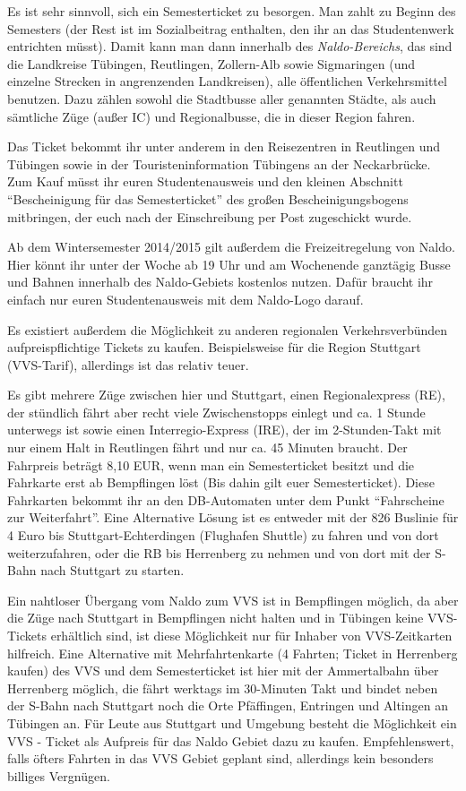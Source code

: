 Es ist sehr sinnvoll, sich ein Semesterticket zu besorgen.  Man zahlt
  zu Beginn des Semesters \Ticketpreis (der Rest ist im Sozialbeitrag
  enthalten, den ihr an das Studentenwerk entrichten müsst).  Damit
  kann man dann innerhalb des \emph{Naldo-Bereichs}, das sind die
  Landkreise Tübingen, Reutlingen, Zollern-Alb sowie Sigmaringen
  (und einzelne Strecken in angrenzenden Landkreisen), alle
  öffentlichen Verkehrsmittel benutzen. Dazu zählen sowohl die
  Stadtbusse aller genannten Städte, als auch sämtliche Züge (außer IC) und
  Regionalbusse, die in dieser Region fahren.

Das Ticket bekommt ihr unter anderem in den Reisezentren in Reutlingen und Tübingen
  sowie in der Touristeninformation Tübingens an der Neckarbrücke.
  Zum Kauf müsst ihr euren Studentenausweis und den kleinen Abschnitt "`Bescheinigung für das Semesterticket"'
  des großen Bescheinigungsbogens mitbringen, der euch nach der Einschreibung per Post zugeschickt wurde.

Ab dem Wintersemester 2014/2015 gilt außerdem die Freizeitregelung von Naldo. Hier könnt ihr unter der Woche ab 19 Uhr und am Wochenende ganztägig Busse und Bahnen innerhalb des Naldo-Gebiets kostenlos nutzen. Dafür braucht ihr einfach nur euren Studentenausweis mit dem Naldo-Logo darauf.

Es existiert außerdem die Möglichkeit zu anderen regionalen Verkehrsverbünden aufpreispflichtige Tickets zu kaufen.
Beispielsweise für die Region Stuttgart (VVS-Tarif), allerdings ist das relativ teuer.

Es gibt mehrere Züge zwischen hier und Stuttgart, einen
  Regionalexpress (RE), der stündlich fährt aber recht viele
  Zwischenstopps einlegt und ca. 1 Stunde unterwegs ist sowie einen
  Interregio-Express (IRE), der im 2-Stunden-Takt mit nur einem Halt
  in Reutlingen fährt und nur ca. 45 Minuten braucht.
  Der Fahrpreis beträgt 8,10 EUR, wenn man ein Semesterticket
  besitzt und die Fahrkarte erst ab Bempflingen löst (Bis dahin gilt euer Semesterticket).
  Diese Fahrkarten bekommt ihr an den DB-Automaten unter dem Punkt "`Fahrscheine zur Weiterfahrt"'.
Eine Alternative Lösung ist es entweder mit der 826 Buslinie für 4 Euro bis Stuttgart-Echterdingen (Flughafen Shuttle) zu fahren und von dort weiterzufahren, oder die RB bis Herrenberg zu nehmen und von dort mit der S-Bahn nach Stuttgart zu starten.


Ein nahtloser Übergang vom Naldo zum VVS ist in Bempflingen
  möglich, da aber die Züge nach Stuttgart in Bempflingen nicht halten und in
  Tübingen keine VVS-Tickets erhältlich sind, ist diese Möglichkeit nur für
  Inhaber von VVS-Zeitkarten hilfreich. Eine Alternative mit Mehrfahrtenkarte
  (4 Fahrten; Ticket in Herrenberg kaufen) des VVS und dem Semesterticket
  ist hier mit der Ammertalbahn
  über Herrenberg möglich, die fährt werktags im 30-Minuten Takt und
  bindet neben der S-Bahn nach Stuttgart noch die Orte Pfäffingen, Entringen
  und Altingen an Tübingen an. Für Leute aus Stuttgart und Umgebung besteht die Möglichkeit ein VVS - Ticket als Aufpreis für das Naldo Gebiet dazu zu kaufen.
 Empfehlenswert, falls öfters Fahrten in das VVS Gebiet geplant sind, allerdings kein besonders billiges Vergnügen.

